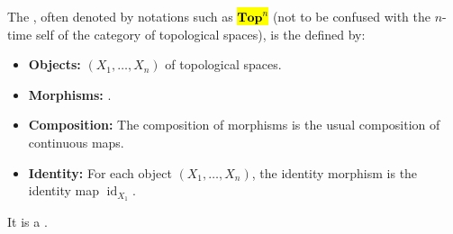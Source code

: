 \begin{definition} \label{definition:category_of_n_tuples_of_topological_spaces}
The , often denoted by notations such as \hl{$\mathbf{Top}^n$} (not to be confused with the $n$-time self  of the category  of topological spaces), is the  defined by:
\begin{itemize}
    \item \textbf{Objects:}  $(X_1, \dots, X_n)$ of topological spaces.
    \item \textbf{Morphisms:} .
    \item \textbf{Composition:} The composition of morphisms is the usual composition of continuous maps.
    \item \textbf{Identity:} For each object $(X_1, \dots, X_n)$, the identity morphism is the identity map $\operatorname{id}_{X_1}$.
\end{itemize}
It is a .
\end{definition}